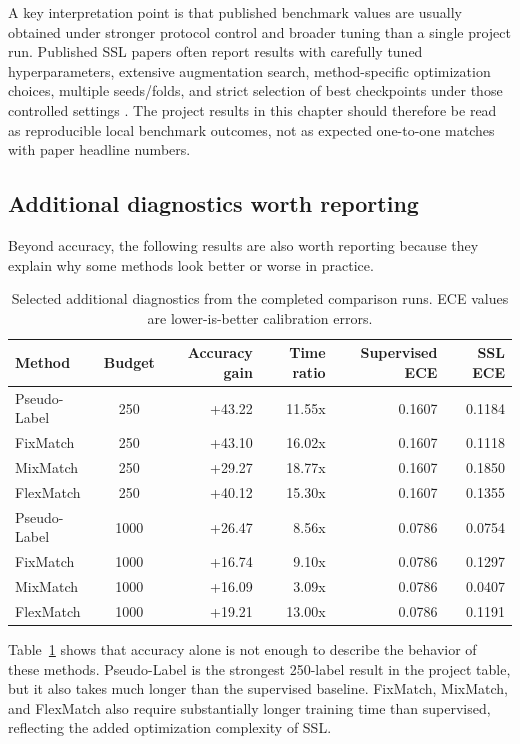 A key interpretation point is that published benchmark values are usually obtained under stronger protocol control and broader tuning than a single project run. Published SSL papers often report results with carefully tuned hyperparameters, extensive augmentation search, method-specific optimization choices, multiple seeds/folds, and strict selection of best checkpoints under those controlled settings \cite{Reference5,Reference7,Reference23}. The project results in this chapter should therefore be read as reproducible local benchmark outcomes, not as expected one-to-one matches with paper headline numbers.

\subsection{Additional diagnostics worth reporting}

Beyond accuracy, the following results are also worth reporting because they explain why some methods look better or worse in practice.

\begin{table}[htbp]
\centering
\footnotesize
\caption{Selected additional diagnostics from the completed comparison runs. ECE values are lower-is-better calibration errors.}
\label{tab:additional_diagnostics}
\begin{tabular}{lcrrrr}
\hline
Method & Budget & Accuracy gain & Time ratio & Supervised ECE & SSL ECE \\
\hline
Pseudo-Label & 250 & +43.22 & 11.55x & 0.1607 & 0.1184 \\
FixMatch & 250 & +43.10 & 16.02x & 0.1607 & 0.1118 \\
MixMatch & 250 & +29.27 & 18.77x & 0.1607 & 0.1850 \\
FlexMatch & 250 & +40.12 & 15.30x & 0.1607 & 0.1355 \\
Pseudo-Label & 1000 & +26.47 & 8.56x & 0.0786 & 0.0754 \\
FixMatch & 1000 & +16.74 & 9.10x & 0.0786 & 0.1297 \\
MixMatch & 1000 & +16.09 & 3.09x & 0.0786 & 0.0407 \\
FlexMatch & 1000 & +19.21 & 13.00x & 0.0786 & 0.1191 \\
\hline
\end{tabular}
\end{table}

Table~\ref{tab:additional_diagnostics} shows that accuracy alone is not enough to describe the behavior of these methods. Pseudo-Label is the strongest 250-label result in the project table, but it also takes much longer than the supervised baseline. FixMatch, MixMatch, and FlexMatch also require substantially longer training time than supervised, reflecting the added optimization complexity of SSL.

